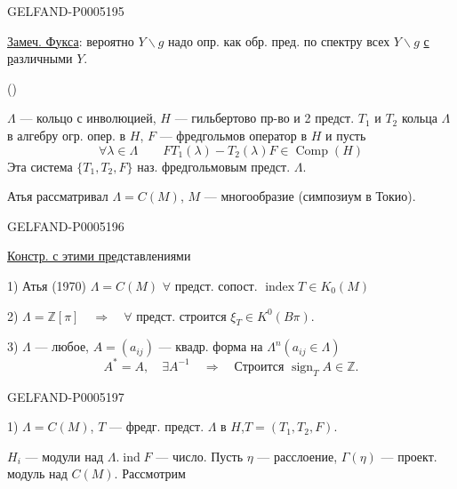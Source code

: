 \begin{GelfandAdjacentEvidence}{GELFAND-P000519}{5}


\uline{Замеч. Фукса}: вероятно $Y\backslash g$ надо опр. как обр. пред. по спектру всех
\underline{$Y\backslash g$} \uline{с р}азличными $Y$.

 ()

$\Lambda$ — кольцо с инволюцией, $H$ — гильбертово пр-во и 2 предст.
$T_1$ и $T_2$ кольца $\Lambda$ в алгебру огр. опер. в $H$, $F$ — фредгольмов оператор в $H$ и пусть
\[
\forall\lambda\in\Lambda\qquad FT_1(\lambda)-T_2(\lambda)F\in\operatorname{Comp}(H)
\]
Эта система $\{T_1,T_2,F\}$ наз. фредгольмовым предст. $\Lambda$.

Атья рассматривал $\Lambda=C(M)$, $M$ — многообразие (симпозиум в Токио).
\end{GelfandAdjacentEvidence}
\begin{GelfandAdjacentEvidence}{GELFAND-P000519}{6}


\uline{Констр. с этими пред}ставлениями

1) Атья (1970) $\Lambda=C(M)$\qquad
$\forall$ предст. сопост. $\operatorname{index}T\in K_0(M)$

2) $\Lambda=\mathbb Z[\pi]\quad\Rightarrow\quad\forall$ предст. строится
$\xi_T\in K^0(B\pi)$.

3) $\Lambda$ — любое,\qquad
$A=(a_{ij})$ — квадр. форма на $\Lambda^n$\quad $(a_{ij}\in\Lambda)$
\[
A^*=A,\quad\exists A^{-1}\quad\Rightarrow\quad
\text{Строится }\operatorname{sign}_T A\in\mathbb Z.
\]

\end{GelfandAdjacentEvidence}
\begin{GelfandAdjacentEvidence}{GELFAND-P000519}{7}

1) $\Lambda=C(M)$, $T$ — фредг. предст. $\Lambda$ в $H$,\quad $T=(T_1,T_2,F)$.

$H_i$ — модули над $\Lambda$.\qquad $\operatorname{ind}F$ — число.
Пусть $\eta$ — расслоение,
$\Gamma(\eta)$ — проект. модуль над $C(M)$. Рассмотрим
\end{GelfandAdjacentEvidence}



